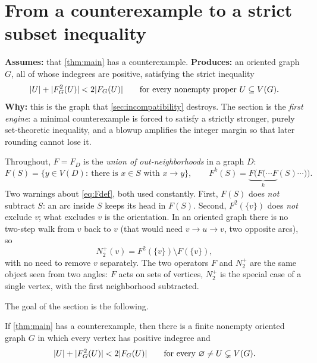 \section{From a counterexample to a strict subset inequality}\label{sec:reduction}

\begin{contract}
\textbf{Assumes:} that \cref{thm:main} has a counterexample. \quad
\textbf{Produces:} an oriented graph $G$, all of whose indegrees are positive, satisfying the
strict inequality
\[
 \lvert U\rvert+\lvert F_G^2(U)\rvert<2\lvert F_G(U)\rvert
 \qquad\text{for every nonempty proper }U\subseteq V(G).
\]
\textbf{Why:} this is the graph that \cref{sec:incompatibility} destroys. The section is the
\emph{first engine}: a minimal counterexample is forced to satisfy a strictly stronger, purely
set-theoretic inequality, and a blowup amplifies the integer margin so that later rounding cannot
lose it.
\end{contract}

Throughout, $F=F_D$ is the \emph{union of out-neighborhoods} in a graph $D$:
\begin{equation}\label{eq:Fdef}
 F(S)=\{y\in V(D):\ \text{there is }x\in S\text{ with }x\to y\},
 \qquad F^k(S)=\underbrace{F(F(\cdots F}_{k}(S)\cdots)).
\end{equation}
Two warnings about \eqref{eq:Fdef}, both used constantly. First, $F(S)$ does \emph{not} subtract
$S$: an arc inside $S$ keeps its head in $F(S)$. Second, $F^2(\{v\})$ does \emph{not} exclude $v$;
what excludes $v$ is the orientation. In an oriented graph there is no two-step walk from $v$ back
to $v$ (that would need $v\to u\to v$, two opposite arcs), so
\begin{equation}\label{eq:N2equals}
 N_2^+(v)=F^2(\{v\})\setminus F(\{v\}),
\end{equation}
with no need to remove $v$ separately. The two operators $F$ and $N_2^+$ are the same object seen
from two angles: $F$ acts on sets of vertices, $N_2^+$ is the special case of a single vertex, with
the first neighborhood subtracted.

The goal of the section is the following.

\begin{proposition}\label{prop:reduction}
If \cref{thm:main} has a counterexample, then there is a finite nonempty oriented graph $G$ in which
every vertex has positive indegree and
\begin{equation}\label{eq:strict-growth}
 \lvert U\rvert+\lvert F_G^2(U)\rvert<2\lvert F_G(U)\rvert
 \qquad\text{for every }\varnothing\ne U\subsetneq V(G).
\end{equation}
\end{proposition}

